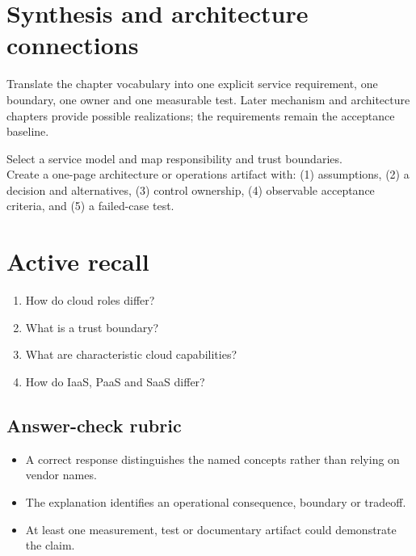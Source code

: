 \documentclass[10pt,letterpaper]{article}
\begin{document}
\section{Synthesis and architecture connections}
Translate the chapter vocabulary into one explicit service requirement, one boundary, one owner and one measurable test. Later mechanism and architecture chapters provide possible realizations; the requirements remain the acceptance baseline.
\begin{workbox}[title={Applied deliverable}]
Select a service model and map responsibility and trust boundaries.\\[4pt]Create a one-page architecture or operations artifact with: (1) assumptions, (2) a decision and alternatives, (3) control ownership, (4) observable acceptance criteria, and (5) a failed-case test.
\end{workbox}
\section{Active recall}
\begin{enumerate}
\item How do cloud roles differ?
\item What is a trust boundary?
\item What are characteristic cloud capabilities?
\item How do IaaS, PaaS and SaaS differ?
\end{enumerate}
\subsection{Answer-check rubric}
\begin{itemize}
\item A correct response distinguishes the named concepts rather than relying on vendor names.
\item The explanation identifies an operational consequence, boundary or tradeoff.
\item At least one measurement, test or documentary artifact could demonstrate the claim.
\end{itemize}
\end{document}
